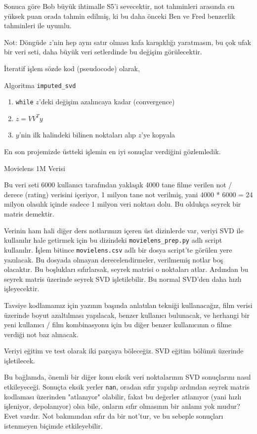 \documentclass[12pt,fleqn]{article}\usepackage{../../common}
\begin{document}
Sonuca göre Bob büyük ihtimalle S5'i sevecektir, not tahminleri arasında en
yüksek puan orada tahmin edilmiş, ki bu daha önceki Ben ve Fred benzerlik
tahminleri ile uyumlu. 

Not: Döngüde $z$'nin hep aynı satır olması kafa karışıklığı yaratmasın, bu
çok ufak bir veri seti, daha büyük veri setlerdinde bu değişim
görülecektir. 

İteratif işlem sözde kod (pseudocode) olarak,

Algoritma \verb!imputed_svd!
\begin{enumerate}
  \item \verb!while! $z$'deki değişim azalıncaya kadar (convergence)
  \item $z = VV^Ty$ 
  \item  $y$'nin ilk halindeki bilinen noktaları alıp $z$'ye kopyala
\end{enumerate}

En son projemizde üstteki işlemin en iyi sonuçlar verdiğini gözlemledik. 

Movielens 1M Verisi

Bu veri seti 6000 kullanıcı tarafından yaklaşık 4000 tane filme
verilen not / derece (rating) verisini içeriyor, 1 milyon tane not
verilmiş, yani 4000 * 6000 = 24 milyon olasılık içinde sadece 1 milyon
veri noktası dolu. Bu oldukça seyrek bir matris demektir.

Verinin ham hali diğer ders notlarımızı içeren üst dizinlerde var, veriyi
SVD ile kullanılır hale getirmek için bu dizindeki \verb!movielens_prep.py!
adlı script kullanılır. İşlem bitince \verb!movielens.csv! adlı bir dosya
script'te görülen yere yazılacak. Bu dosyada olmayan derecelendirmeler,
verilmemiş notlar boş olacaktır. Bu boşlukları sıfırlarsak, seyrek matrisi
o noktaları atlar. Ardından bu seyrek matris üzerinde seyrek SVD
işletilebilir. Bu normal SVD'den daha hızlı işleyecektir.

Tavsiye kodlamamız için yazının başında anlatılan tekniği kullanacağız, film
verisi üzerinde boyut azaltılması yapılacak, benzer kullanıcı bulunacak, ve
herhangi bir yeni kullanıcı / film kombinasyonu için bu diğer benzer
kullanıcının o filme verdiği not baz alınacak.

Veriyi eğitim ve test olarak iki parçaya böleceğiz. SVD eğitim bölümü
üzerinde işletilecek.

Bu bağlamda, önemli bir diğer konu eksik veri noktalarının SVD
sonuçlarını nasıl etkileyeceği. Sonuçta eksik yerler \verb!nan!,
oradan sıfır yapılıp ardından seyrek matris kodlaması üzerinden
"atlanıyor" olabilir, fakat bu değerler atlanıyor (yani hızlı
işleniyor, depolanıyor) olsa bile, onların sıfır olmasının bir anlamı
yok mudur? Evet vardır. Not bakımından sıfır da bir not'tur, ve bu
sebeple sonuçları istenmeyen biçimde etkileyebilir.
\end{document}
